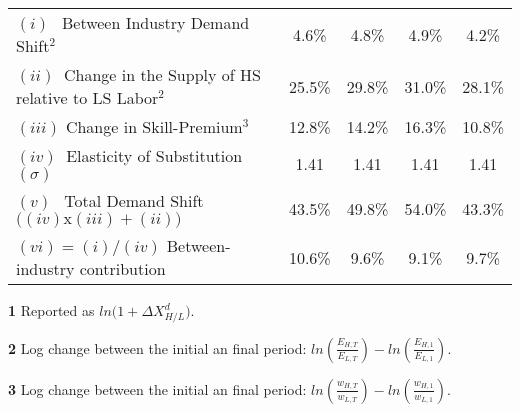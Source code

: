\documentclass[10pt]{article}
\begin{document}
\begin{landscape}
\begin{table}[!t]
\begin{threepartable}
\begin{tabular}{lcccc}
\multicolumn{1}{l|}{ $(i) \ \ $ Between Industry Demand Shift$^{2}$}                        & 4.6\%      & 4.8\%      & 4.9\%     & 4.2\%      \\
\multicolumn{1}{l|}{ $(ii) \  $ Change in the Supply of HS relative to LS Labor$^{2}$}      & 25.5\%     & 29.8\%     & 31.0\%    & 28.1\%     \\
\multicolumn{1}{l|}{ $(iii)   $ Change in Skill-Premium$^{3}$}                              & 12.8\%     & 14.2\%     & 16.3\%    & 10.8\%     \\
\multicolumn{1}{l|}{ $(iv) \  $ Elasticity of Substitution $(\sigma)$}                      & 1.41       & 1.41       & 1.41      & 1.41       \\ 
\multicolumn{1}{l|}{ $(v) \ \ $ Total Demand Shift $\big( (iv) \text{x} (iii) + (ii) \big)$}& 43.5\%     & 49.8\%     & 54.0\%    & 43.3\%     \\
\hline
\multicolumn{1}{l|}{ $(vi) = (i)/(iv)$ Between-industry contribution}                       & 10.6\%     & 9.6\%      & 9.1\%     & 9.7\%      \\\hline \hline
\end{tabular}
\begin{tablenotes} \scriptsize
\item{\textbf{1}}  Reported as $ln\Big(1+\Delta X^{d}_{ H/L } \Big)$.\\
\item{\textbf{2}} Log change between the initial an final period: $ln\left(\frac{E_{H,T}}{E_{L,T}}\right)-ln\left(\frac{E_{H,1}}{E_{L,1}}\right)$.\\
\item{\textbf{3}} Log change between the initial an final period: $ln\left(\frac{w_{H,T}}{w_{L,T}}\right)-ln\left(\frac{w_{H,1}}{w_{L,1}}\right)$.\\ \hline
\end{tablenotes}
\end{threepartable}
\end{table}
\end{landscape}
\end{document}
